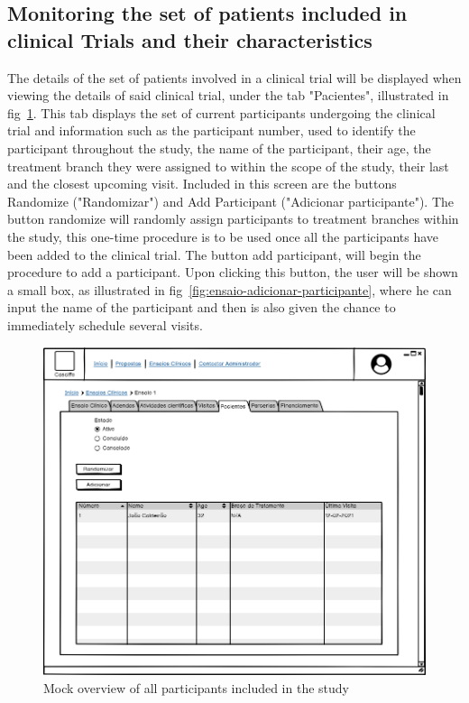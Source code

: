 \subsection{Monitoring the set of patients included in clinical Trials and their characteristics}

The details of the set of patients involved in a clinical trial will be displayed when viewing the details of said clinical trial, under the tab "Pacientes", illustrated in fig~\ref{fig:ensaio-participantes}. This tab displays the set of current participants undergoing the clinical trial and information such as the participant number, used to identify the participant throughout the study, the name of the participant, their age, the treatment branch they were assigned to within the scope of the study, their last and the closest upcoming visit.  
Included in this screen are the buttons Randomize ("Randomizar") and Add Participant ("Adicionar participante").
The button randomize will randomly assign participants to treatment branches within the study, this one-time procedure is to be used once all the participants have been added to the clinical trial.  
The button add participant, will begin the procedure to add a participant. Upon clicking this button, the user will be shown a small box, as illustrated in fig~\ref{fig:ensaio-adicionar-participante}, where he can input the name of the participant and then is also given the chance to immediately schedule several visits.

\begin{figure}
    \centering
    \includegraphics{images/ensaio-participantes.png}
    \caption{Mock overview of all participants included in the study}
    \label{fig:ensaio-participantes}
\end{figure}

